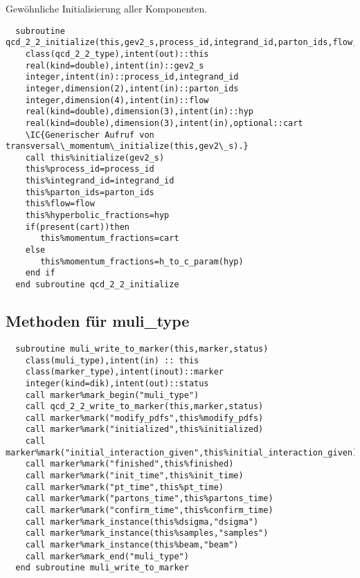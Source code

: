 Gewöhnliche Initialisierung aller Komponenten.
\begin{Verbatim}
  subroutine qcd_2_2_initialize(this,gev2_s,process_id,integrand_id,parton_ids,flow,hyp,cart)
    class(qcd_2_2_type),intent(out)::this
    real(kind=double),intent(in)::gev2_s
    integer,intent(in)::process_id,integrand_id
    integer,dimension(2),intent(in)::parton_ids
    integer,dimension(4),intent(in)::flow
    real(kind=double),dimension(3),intent(in)::hyp
    real(kind=double),dimension(3),intent(in),optional::cart
    \IC{Generischer Aufruf von transversal\_momentum\_initialize(this,gev2\_s).}
    call this%initialize(gev2_s)
    this%process_id=process_id
    this%integrand_id=integrand_id
    this%parton_ids=parton_ids
    this%flow=flow
    this%hyperbolic_fractions=hyp
    if(present(cart))then
       this%momentum_fractions=cart
    else
       this%momentum_fractions=h_to_c_param(hyp)
    end if
  end subroutine qcd_2_2_initialize
\end{Verbatim}
\subsection{Methoden für muli\_type}
\begin{Verbatim}
  subroutine muli_write_to_marker(this,marker,status)
    class(muli_type),intent(in) :: this
    class(marker_type),intent(inout)::marker
    integer(kind=dik),intent(out)::status
    call marker%mark_begin("muli_type")
    call qcd_2_2_write_to_marker(this,marker,status)
    call marker%mark("modify_pdfs",this%modify_pdfs)
    call marker%mark("initialized",this%initialized)
    call marker%mark("initial_interaction_given",this%initial_interaction_given)
    call marker%mark("finished",this%finished)
    call marker%mark("init_time",this%init_time)
    call marker%mark("pt_time",this%pt_time)
    call marker%mark("partons_time",this%partons_time)
    call marker%mark("confirm_time",this%confirm_time)
    call marker%mark_instance(this%dsigma,"dsigma")
    call marker%mark_instance(this%samples,"samples")
    call marker%mark_instance(this%beam,"beam")
    call marker%mark_end("muli_type")
  end subroutine muli_write_to_marker
\end{Verbatim}


